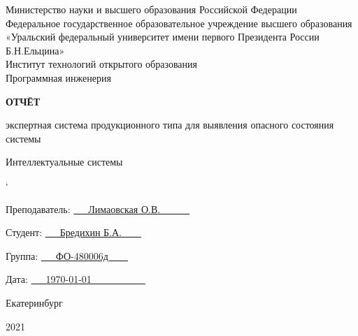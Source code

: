\begin{titlepage}
    \begin{center}
        \small
        Министерство науки и высшего образования Российской Федерации\\
        Федеральное государственное образовательное учреждение высшего образования\\
        «Уральский федеральный университет имени первого Президента России Б.Н.Ельцина»\\
        Институт технологий открытого образования\\
        Программная инженерия
    \end{center}

    \vspace{3cm}
    
    \begin{center}
        {\Large \bfseries ОТЧЁТ}
        
        {\large экспертная система продукционного типа для выявления опасного состояния системы }

        Интеллектуальные системы
    \end{center}

`	\vspace{3em}

    
    \begin{flushright}
        \begin{minipage}[t]{0.5\columnwidth}%
            Преподаватель:
            \underline{~~~Лимаовская О.В.~~~~~~}
            
            Студент:
            \underline{~~~Бредихин Б.А.~~~~}
            
            Группа: 
            \underline{~~~ФО-480006д~~~~}
            
            Дата: 
            \underline{~~~\today~~~~~~~~~~~}
        \end{minipage}
    \par\end{flushright}

    \vspace{\fill}
    
    \begin{center}
        Екатеринбург
        
        2021
    \end{center}

\end{titlepage}

